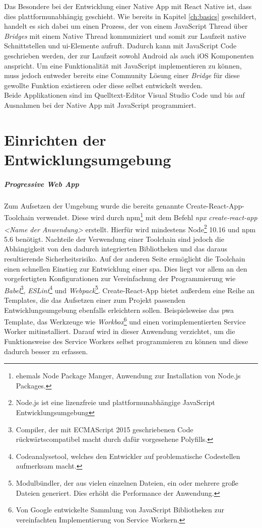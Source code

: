 Das Besondere bei der Entwicklung einer Native App mit React Native ist, dass dies plattformunabhängig geschieht.
Wie bereits in Kapitel \ref{ch:basics} geschildert, handelt es sich dabei um einen Prozess, der von einem JavaScript Thread über \textit{Bridges} mit einem Native Thread kommuniziert und somit zur Laufzeit native Schnittstellen und \ac{ui}-Elemente aufruft.
Dadurch kann mit JavaScript Code geschrieben werden, der zur Laufzeit sowohl Android als auch iOS Komponenten anspricht.
Um eine Funktionalität mit JavaScript implementieren zu können, muss jedoch entweder bereits eine Community Lösung einer \textit{Bridge} für diese gewollte Funktion existieren oder diese selbst entwickelt werden.\\
Beide Applikationen sind im Quelltext-Editor Visual Studio Code und bis auf Ausnahmen bei der Native App mit JavaScript programmiert.

\section{Einrichten der Entwicklungsumgebung}
\subparagraph{Progressive Web App\\}
Zum Aufsetzen der Umgebung wurde die bereits genannte Create-React-App-Toolchain verwendet.
Diese wird durch npm\footnote{ehemals Node Package Manger, Anwendung zur Installation von Node.js Packages.} mit dem Befehl \textit{npx create-react-app <Name der Anwendung>} erstellt.
Hierfür wird mindestens Node\footnote{Node.js ist eine lizenzfreie und plattformunabhängige JavaScript Entwicklungsumgebung} 10.16 und npm 5.6 benötigt.
Nachteile der Verwendung einer Toolchain sind jedoch die Abhängigkeit von den dadurch integrierten Bibliotheken und das daraus resultierende Sicherheitsrisiko. 
Auf der anderen Seite ermöglicht die Toolchain einen schnellen Einstieg zur Entwicklung einer \ac{spa}.
Dies liegt vor allem an den vorgefertigten Konfigurationen zur Vereinfachung der Programmierung wie \textit{Babel}\footnote{Compiler, der mit ECMAScript 2015 geschriebenen Code rückwärtscompatibel macht durch dafür vorgesehene Polyfills.}, \textit{ESLint}\footnote{Codeanalysetool, welches den Entwickler auf problematische Codestellen aufmerksam macht.} und \textit{Webpack}\footnote{Modulbündler, der aus vielen einzelnen Dateien, ein oder mehrere große Dateien generiert. Dies erhöht die Performance der Anwendung.}.
Create-React-App bietet außerdem eine Reihe an Templates, die das Aufsetzen einer zum Projekt passenden Entwicklungsumgebung ebenfalls erleichtern sollen.
Beispielsweise das \ac{pwa} Template, das Werkzeuge wie \textit{Workbox}\footnote{Von Google entwickelte Sammlung von JavaScript Bibliotheken zur vereinfachten Implementierung von Service Workern.} und einen vorimplementierten Service Worker mitinstalliert.
Darauf wird in dieser Anwendung verzichtet, um die Funktionsweise des Service Workers selbst programmieren zu können und diese dadurch besser zu erfassen.

